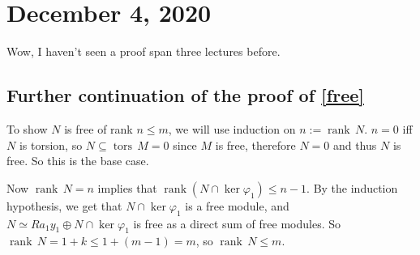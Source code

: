 \section{December 4, 2020}
Wow, I haven't seen a proof span three lectures before.
\subsection{Further continuation of the proof of \cref{free}}
To show $N$ is free of rank $n\leq m$, we will use induction on $n:= \operatorname{rank}\, N$. $n=0$ iff $N$ is torsion, so $N\subseteq \operatorname{tors}\, M=0$ since $M$ is free, therefore $N=0$ and thus $N$ is free. So this is the base case. 

Now $\operatorname{rank}\,N=n$ implies that $\operatorname{rank }\left( N \cap \ker \varphi_1  \right) \leq n-1$. By the induction hypothesis, we get that $N \cap \ker \varphi_1 $ is a free module, and $N\simeq Ra_1y_1\oplus N \cap \ker \varphi_1 $ is free as a direct sum of free modules. So $\operatorname{rank}\, N=1+k\leq 1+(m-1)=m$, so $\operatorname{rank}\, N \leq m$.

